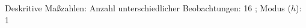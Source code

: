 				\label{tableValues:adem03b_g2}
				\vspace*{-\baselineskip}
                    \begin{noten}
                	    \note{} Deskritive Maßzahlen:
                	    Anzahl unterschiedlicher Beobachtungen: 16%
                	    ; 
                	      Modus ($h$): 1
                     \end{noten}


